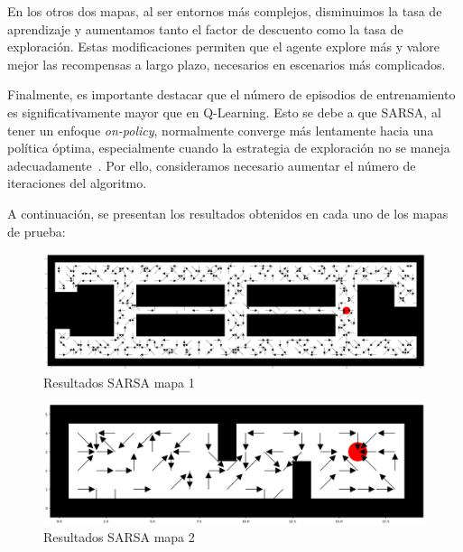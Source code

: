\documentclass[conference,a4paper]{IEEEtran}
\begin{document}
En los otros dos mapas, al ser entornos más complejos, disminuimos la tasa de aprendizaje y aumentamos tanto el factor de descuento como la tasa de exploración. Estas modificaciones permiten que el agente explore más y valore mejor las recompensas a largo plazo, necesarios en escenarios más complicados.\newline

Finalmente, es importante destacar que el número de episodios de entrenamiento es significativamente mayor que en Q-Learning. Esto se debe a que SARSA, al tener un enfoque \textit{on-policy}, normalmente converge más lentamente hacia una política óptima, especialmente cuando la estrategia de exploración no se 
maneja adecuadamente~\cite{b4}. Por ello, consideramos necesario aumentar el número de iteraciones del algoritmo.\newline

A continuación, se presentan los resultados obtenidos en cada uno de los mapas de prueba:\newline

\begin{figure}[h]
  \centering
  \includegraphics[scale=0.33]{resultado_sarsa_mapa_1}
  \caption{Resultados SARSA mapa 1}
  \label{fig:resultado_sarsa_mapa_1}
\end{figure}

\begin{figure}[h]
  \centering
  \includegraphics[scale=0.33]{resultado_sarsa_mapa_2}
  \caption{Resultados SARSA mapa 2}
  \label{fig:resultado_sarsa_mapa_2}
\end{figure}
\end{document}
